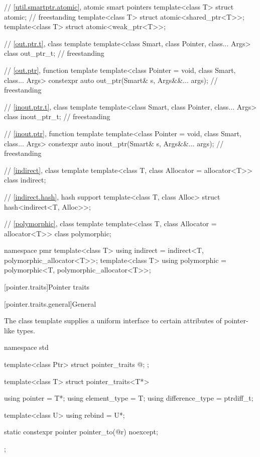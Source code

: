 \begin{codeblock}
{  // \ref{util.smartptr.atomic}, atomic smart pointers
  template<class T> struct atomic;                                                  // freestanding
  template<class T> struct atomic<shared_ptr<T>>;
  template<class T> struct atomic<weak_ptr<T>>;

  // \ref{out.ptr.t}, class template 
  template<class Smart, class Pointer, class... Args>
    class out_ptr_t;                                                                // freestanding

  // \ref{out.ptr}, function template 
  template<class Pointer = void, class Smart, class... Args>
    constexpr auto out_ptr(Smart& s, Args&&... args);                               // freestanding

  // \ref{inout.ptr.t}, class template 
  template<class Smart, class Pointer, class... Args>
    class inout_ptr_t;                                                              // freestanding

  // \ref{inout.ptr}, function template 
  template<class Pointer = void, class Smart, class... Args>
    constexpr auto inout_ptr(Smart& s, Args&&... args);                             // freestanding

  // \ref{indirect}, class template 
  template<class T, class Allocator = allocator<T>>
    class indirect;

  // \ref{indirect.hash}, hash support
  template<class T, class Alloc> struct hash<indirect<T, Alloc>>;

  // \ref{polymorphic}, class template 
  template<class T, class Allocator = allocator<T>>
    class polymorphic;

  namespace pmr {
    template<class T> using indirect    = indirect<T, polymorphic_allocator<T>>;
    template<class T> using polymorphic = polymorphic<T, polymorphic_allocator<T>>;
  }
}
\end{codeblock}

[pointer.traits]{Pointer traits}

[pointer.traits.general]{General}

\pnum
The class template  supplies a uniform interface to certain
attributes of pointer-like types.

%
\begin{codeblock}
namespace std {
  template<class Ptr> struct pointer_traits {
    @\seebelow@;
  };

  template<class T> struct pointer_traits<T*> {
    using pointer         = T*;
    using element_type    = T;
    using difference_type = ptrdiff_t;

    template<class U> using rebind = U*;

    static constexpr pointer pointer_to(@\seebelow@ r) noexcept;
  };
}
\end{codeblock}


